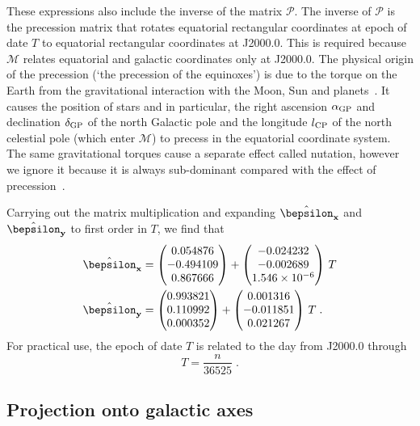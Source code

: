 \documentclass[preprintnumbers,a4paper,twocolumn,floats,nofootinbib,superscriptaddress,aps,prd]{revtex4-1}
\newcommand{\epx}{\hat{\bepsilon}_{\mathbf{x}}}
\newcommand{\epy}{\hat{\bepsilon}_{\mathbf{y}}}
\begin{document}
These expressions also include the inverse of the matrix $\mathcal{P}$. The inverse of $\mathcal{P}$ is the precession matrix that rotates equatorial rectangular coordinates at epoch of date $T$ to equatorial rectangular coordinates at J2000.0. This is required because $\mathcal{M}$ relates equatorial and galactic coordinates only at J2000.0. The physical origin of the precession (`the precession of the equinoxes') is due to the torque on the Earth from the gravitational interaction with the Moon, Sun and planets~\cite{Green:2003yh}. It causes the position of stars and in particular, the right ascension $\alpha_{\rm{GP}}$ and declination $\delta_{\rm{GP}}$ of the north Galactic pole and the longitude $l_{\rm{CP}}$ of the north celestial pole (which enter $\mathcal{M}$) to precess in the equatorial coordinate system. The same gravitational torques cause a separate effect called nutation, however we ignore it because it is always sub-dominant compared with the effect of precession~\cite{Green:2003yh}. 

Carrying out the matrix multiplication and expanding $\epx$ and $\epy$ to first order in $T$, we find that
\begin{align}
\label{eq:epx}
\epx&=
 \begin{pmatrix}
0.054876\\
-0.494109 \\
0.867666
 \end{pmatrix}+ \begin{pmatrix}
-0.024232 \\
-0.002689  \\
1.546\times10^{-6}
 \end{pmatrix}\,T\\
\epy&=
 \begin{pmatrix}
0.993821\\
 0.110992 \\
0.000352
 \end{pmatrix}+\begin{pmatrix}
0.001316\\
-0.011851 \\
0.021267
 \end{pmatrix}\,T\;.
 \label{eq:epy}
\end{align}
For practical use, the epoch of date $T$ is related to the day from J2000.0 through
\begin{equation}
T=\frac{n}{36525}\;.
\end{equation}

\subsection{Projection onto galactic axes}
\label{subsection:galactic}
\end{document}
